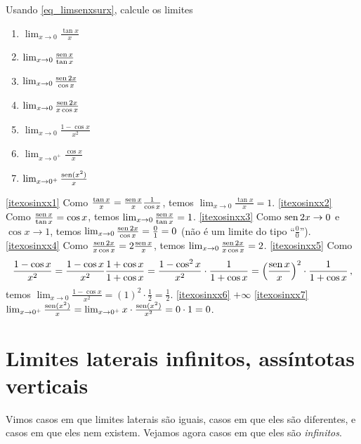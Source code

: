 \begin{exo}\label{Exo:variantessinxsurx}
Usando \eqref{eq_limsenxsurx}, calcule os limites 
\begin{multicols}{4}
\begin{enumerate}
\item\label{itexosinxx1} $\lim_{x\to 0}\tfrac{\tan x}{x}$
\item\label{itexosinxx2} $\lim_{x\to 0}\tfrac{\operatorname{sen} x}{\tan x}$
\item\label{itexosinxx3} $\lim_{x\to 0}\frac{\operatorname{sen} 2x}{\cos x}$
\item\label{itexosinxx4} $\lim_{x\to 0}\frac{\operatorname{sen} 2x}{x\cos x}$
\item\label{itexosinxx5} $\lim_{x\to 0}\tfrac{1-\cos x}{x^2}$
\item\label{itexosinxx6} $\lim_{x\to 0^+}\tfrac{\cos x}{x}$
\item\label{itexosinxx7} $\lim_{x\to 0^+}\tfrac{\operatorname{sen} (x^2)}{x}$
\end{enumerate}
\end{multicols}
\vspace{0.01cm}
\begin{sol} \eqref{itexosinxx1}
Como $\frac{\tan x}{x}=\frac{\operatorname{sen} x}{x}\frac{1}{\cos x}$,
temos $\lim_{x\to 0}\tfrac{\tan x}{x}=1$.
\eqref{itexosinxx2}
Como $\frac{\operatorname{sen} x}{\tan x}=\cos x$, temos $\lim_{x\to 0}\tfrac{\operatorname{sen}
x}{\tan x}=1$.
\eqref{itexosinxx3} Como ${\operatorname{sen} 2x}\to 0$ e ${\cos x}\to 1$, temos $\lim_{x\to 0}\frac{\operatorname{sen} 2x}{\cos x}=\frac{0}{1}=0$ (não é um limite do tipo ``$\frac00$'').
\eqref{itexosinxx4}
Como $\frac{\operatorname{sen} 2x}{x\cos x}=2\frac{\operatorname{sen} x}{x}$,
temos $\lim_{x\to 0}\frac{\operatorname{sen} 2x}{x\cos x}=2$.
\eqref{itexosinxx5} Como 
$$\frac{1-\cos x}{x^2}=\frac{1-\cos x}{x^2}\frac{1+\cos
x}{1+\cos x}=\frac{1-\cos^2x}{x^2}\cdot \frac{1}{1+\cos x}=\Bigl(\frac{\operatorname{sen} x}{x}\Bigr)^2\cdot \frac{1}{1+\cos x}\,,$$
temos 
$\lim_{x\to 0}\tfrac{1-\cos x}{x^2}=(1)^2\cdot \frac12=\frac12$.
\eqref{itexosinxx6} $+\infty$
\eqref{itexosinxx7}  $\lim_{x\to 0^+}\tfrac{\operatorname{sen} (x^2)}{x}=\lim_{x\to
0^+}x\cdot\tfrac{\operatorname{sen}(x^2)}{x^2}=0\cdot 1=0$.
\end{sol}
\end{exo}



\section{Limites laterais infinitos, assíntotas verticais}
Vimos casos em que limites laterais são iguais, casos em que eles são 
diferentes, e casos em que eles nem existem. Vejamos agora casos em que
eles são \emph{infinitos}.

